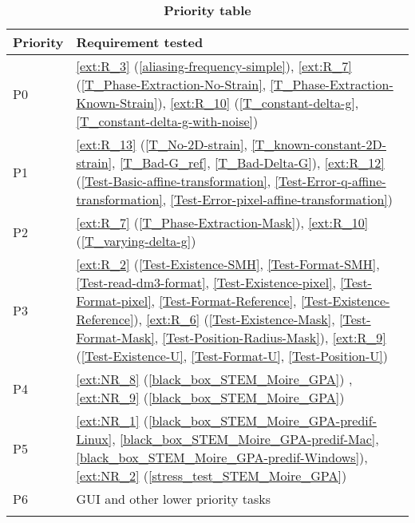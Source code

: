 \documentclass[12pt, titlepage]{article}
\begin{document}
\noindent 
\begin{longtable}{l p{10cm}}

\toprule
\textbf{Priority} & \textbf{Requirement tested}\\
\midrule
\endhead
P0 & \cref{ext:R_3} (\cref{aliasing-frequency-simple}), \cref{ext:R_7} (\cref{T_Phase-Extraction-No-Strain}, \cref{T_Phase-Extraction-Known-Strain}), \cref{ext:R_10} (\cref{T_constant-delta-g}, \cref{T_constant-delta-g-with-noise}) \\
P1 & \cref{ext:R_13} (\cref{T_No-2D-strain}, \cref{T_known-constant-2D-strain}, \cref{T_Bad-G_ref}, \cref{T_Bad-Delta-G}), \cref{ext:R_12}  (\cref{Test-Basic-affine-transformation}, \cref{Test-Error-q-affine-transformation}, \cref{Test-Error-pixel-affine-transformation}) \\
P2 & \cref{ext:R_7} (\cref{T_Phase-Extraction-Mask}), \cref{ext:R_10} (\cref{T_varying-delta-g}) \\
P3 & \cref{ext:R_2} (\cref{Test-Existence-SMH}, \cref{Test-Format-SMH}, \cref{Test-read-dm3-format}, \cref{Test-Existence-pixel}, \cref{Test-Format-pixel}, \cref{Test-Format-Reference}, \cref{Test-Existence-Reference}), \cref{ext:R_6}  (\cref{Test-Existence-Mask}, \cref{Test-Format-Mask}, \cref{Test-Position-Radius-Mask}), \cref{ext:R_9} (\cref{Test-Existence-U}, \cref{Test-Format-U}, \cref{Test-Position-U}) \\
P4 & \cref{ext:NR_8} (\cref{black_box_STEM_Moire_GPA}) , \cref{ext:NR_9} (\cref{black_box_STEM_Moire_GPA}) \\
P5 & \cref{ext:NR_1} (\cref{black_box_STEM_Moire_GPA-predif-Linux}, \cref{black_box_STEM_Moire_GPA-predif-Mac}, \cref{black_box_STEM_Moire_GPA-predif-Windows}), \cref{ext:NR_2} (\cref{stress_test_STEM_Moire_GPA}) \\
P6 & GUI and other lower priority tasks \\
\bottomrule
\caption{\textbf{Priority table}}
\label{priority_table}
\end{longtable}




\newpage
\end{document}
